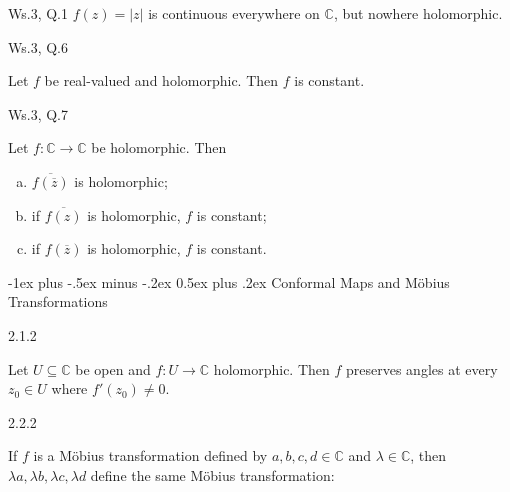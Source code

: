 \documentclass[10pt,landscape]{article}
\makeatletter
\renewcommand{\section}{\@startsection{section}{1}{0mm}%
                                {-1ex plus -.5ex minus -.2ex}%
                                {0.5ex plus .2ex}%
                                {\normalfont\large\bfseries}}
\makeatother
\begin{document}
\begin{multicols}{3}
\begin{question}{Ws.3, Q.1}{}
    $f(z) = |z|$ is continuous everywhere on $\mathbb{C}$, but nowhere holomorphic.

\end{question}

\begin{question}{Ws.3, Q.6}{}

    Let $f$ be real-valued and holomorphic. Then $f$ is constant.

\end{question}

\begin{question}{Ws.3, Q.7}{}

    Let $f: \mathbb{C} \to \mathbb{C}$ be holomorphic. Then

        \begin{enumerate}[(a)]
            \setlength{\parskip}{0em}
            \item $\overline{f(\overline{z})}$ is holomorphic;
            \item if $\overline{f(z)}$ is holomorphic, $f$ is constant;
            \item if $f(\overline{z})$ is holomorphic, $f$ is constant.
        \end{enumerate}

\end{question}


\section{Conformal Maps and Möbius Transformations}

\begin{theorem}{2.1.2}{}

    Let $U \subseteq \mathbb{C}$ be open and $f: U \to \mathbb{C}$ holomorphic. Then $f$ preserves angles at every $z_0 \in U$ where $f'(z_0) \neq 0$.

\end{theorem}

\begin{remark}{2.2.2}{}

    If $f$ is a Möbius transformation defined by $a,b,c,d \in \mathbb{C}$ and $\lambda \in \mathbb{C}$, then $\lambda a, \lambda b, \lambda c, \lambda d$ define the same Möbius transformation:


\end{remark}
\end{multicols}
\end{document}
